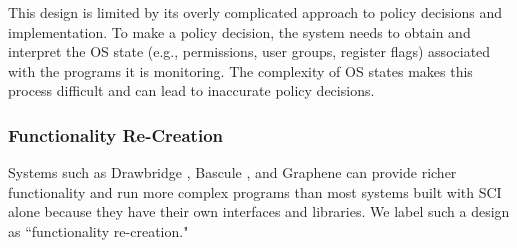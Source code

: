 
This design is limited by its overly complicated approach to policy
decisions and implementation.
To make a policy decision, the system needs to
obtain and interpret the OS state (e.g., permissions, user groups, register flags)
associated with the programs it is monitoring.
The complexity of OS states makes this process difficult and can lead to
inaccurate policy decisions.

\subsubsection{Functionality Re-Creation}
Systems such as Drawbridge \cite{Drawbridge-11},
Bascule \cite{Bascule}, and Graphene \cite{Graphene-14} can
provide richer functionality and run more complex programs than most systems built
with SCI alone because they have their own
interfaces and libraries. We label such a design
as ``functionality re-creation."

